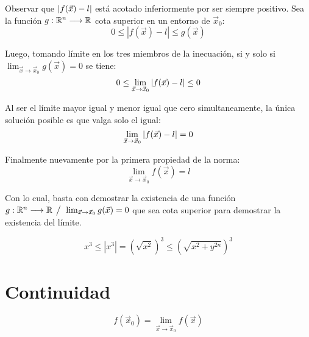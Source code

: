 Observar que ${\left| {f(\Vec{x})-l} \right|}$ está acotado inferiormente por ser siempre positivo.
Sea la función $g:\mathbb{R}^n \longrightarrow \mathbb{R}$ cota superior en un entorno de $\Vec{x}_0$:
\begin{equation*}
    0 \leq |f(\Vec{x})-l| \leq g(\Vec{x})
\end{equation*}

Luego, tomando límite en los tres miembros de la inecuación, si y solo si $\lim_{\Vec{x} \to \Vec{x}_0} g(\Vec{x})=0$ se tiene:
\begin{equation*}
    0 \leq \lim_{\Vec{x} \to \Vec{x}_0} {\left| {f(\Vec{x})-l} \right|} \leq 0
\end{equation*}

Al ser el límite mayor igual y menor igual que cero simultaneamente, la única solución posible es que valga solo el igual:
\begin{equation*}
    \lim_{\Vec{x} \to \Vec{x}_0} {\left| {f(\Vec{x})-l} \right|} = 0
\end{equation*}

Finalmente nuevamente por la primera propiedad de la norma:
\begin{equation*}
    \lim_{\Vec{x} \to \Vec{x}_0} f(\Vec{x}) = l
\end{equation*}

Con lo cual, basta con demostrar la existencia de una función $g:\mathbb{R}^n \longrightarrow \mathbb{R} \hspace{1ex} \big/ \hspace{1ex} \lim_{\Vec{x} \to \Vec{x}_0} g(\Vec{x})=0$ que sea cota superior para demostrar la existencia del límite.



\begin{equation*}
x^3 \leq |x^3| = \left( \sqrt{x^2} \right)^3 \leq \left( \sqrt{x^2+y^{2n}} \right)^3
\end{equation*}


\section{Continuidad}

\begin{mdframed}[style=DefinitionFrame]
    \begin{defn}
    \end{defn}
    \begin{equation*}
        f(\Vec{x}_0)= \lim_{\Vec{x} \to \Vec{x}_0} f(\Vec{x})
    \end{equation*}
\end{mdframed}